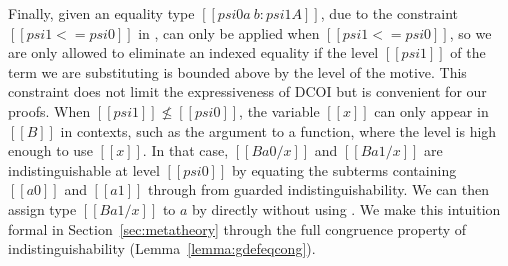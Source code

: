 \documentclass[acmsmall]{acmart}
\newcommand{\scw}[1]{}
\newcommand{\yl}[1]{}
\newcommand{\jws}[1]{}
\newcommand{\name}{DCOI\xspace}
\begin{document}
Finally, given an equality type $[[psi0 a ~ b : psi1 A]]$, due to the
constraint $[[psi1 <= psi0]]$ in ,  can only be
applied when $[[psi1 <= psi0]]$, so we are only allowed to eliminate an
indexed equality if the level $[[psi1]]$ of the term we are substituting is
bounded above by the level of the motive. This constraint does not limit the
expressiveness of \name{} but is convenient for our proofs. When
$[[psi1]] \nleq [[psi0]]$, the variable $[[x]]$ can only appear in $[[B]]$ in
contexts, such as the argument to a function, where the level is high enough
to use $[[x]]$. In that case, $[[B {a0 / x}]]$ and $[[B {a1 / x}]]$ are
indistinguishable at level $[[psi0]]$ by equating the subterms containing
$[[a0]]$ and $[[a1]]$ through  from guarded
indistinguishability. We can then assign type
$[[B {a1 / x}]]$ to $a$ by  directly without using .  We
make this intuition formal in Section~\ref{sec:metatheory} through the full
congruence property of indistinguishability (Lemma~\ref{lemma:gdefeqcong}).
\end{document}
